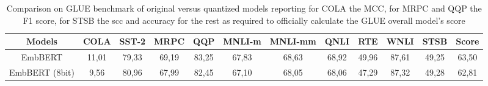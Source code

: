 \begin{table*}[htbp]
    \caption{Comparison on GLUE benchmark of original versus quantized models reporting for COLA the MCC, for MRPC and QQP the F1 score, for STSB the \gls{scc} and accuracy for the rest as required to officially calculate the GLUE overall model's score}
    \begin{center}
    
        \begin{tabular}{| c | c c c c c c c c c c | c |}
        \hline
        \textbf{Models}         & COLA      & SST-2     & MRPC      & QQP       & MNLI-m    & MNLI-mm   & QNLI      & RTE       & WNLI      & STSB      & Score \\
        \hline
        \hline
        EmbBERT           & 11,01     & 79,33     & 69,19     & 83,25     & 67,83     & 68,63     & 68,92     & 49,96     & 87,61     & 49,25     & 63,50 \\
        \hline
        EmbBERT (8bit)     & 9,56      & 80,96     & 67,99     & 82,45     & 67,10     & 68,05     & 68,06     & 47,29    & 87,32      & 49,28     & 62,81 \\
        \hline
        \end{tabular}

    \label{table:res_glue_quant}
    \end{center}

    
\end{table*}











